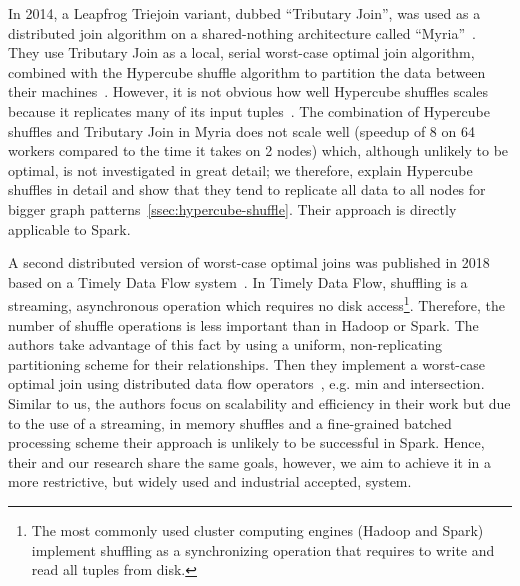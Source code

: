 In 2014, a Leapfrog Triejoin variant, dubbed ``Tributary Join'', was used as a distributed join algorithm on a shared-nothing architecture called ``Myria''~\cite{myria-detailed}.
They use Tributary Join as a local, serial worst-case optimal join algorithm, combined with the Hypercube shuffle algorithm to partition the data between their machines~\cite{hypercube}.
However, it is not obvious how well Hypercube shuffles scales because it replicates many of its input tuples~\cite{myria-detailed}.
The combination of Hypercube shuffles and Tributary Join in Myria does not scale well (speedup of 8 on 64 workers compared to the time it takes on 2 nodes) which, although unlikely to be optimal, is not investigated in great detail; we therefore, explain Hypercube shuffles in detail and show that they tend to replicate all data to all nodes for bigger graph patterns~\cref{ssec:hypercube-shuffle}.
Their approach is directly applicable to Spark.




A second distributed version of worst-case optimal joins was published in 2018 based on a Timely Data Flow system~\cite{ammar2018distributed,naiad}.
In Timely Data Flow, shuffling is a streaming, asynchronous operation which requires no disk access\footnote{The most commonly used cluster computing engines (Hadoop and Spark) implement shuffling as a synchronizing operation that requires to write and read all tuples from disk.}.
Therefore, the number of shuffle operations is less important than in Hadoop or Spark.
The authors take advantage of this fact by using a uniform, non-replicating partitioning scheme for their relationships.
Then they implement a worst-case optimal join using distributed data flow operators~\cite{naiad}, e.g. min and intersection.
Similar to us, the authors focus on scalability and efficiency in their work but due to the use of a streaming, in memory shuffles and a fine-grained batched processing scheme their approach is unlikely to be successful in Spark.
Hence, their and our research share the same goals, however, we aim to achieve it in a more restrictive, but widely used and industrial accepted, system.

